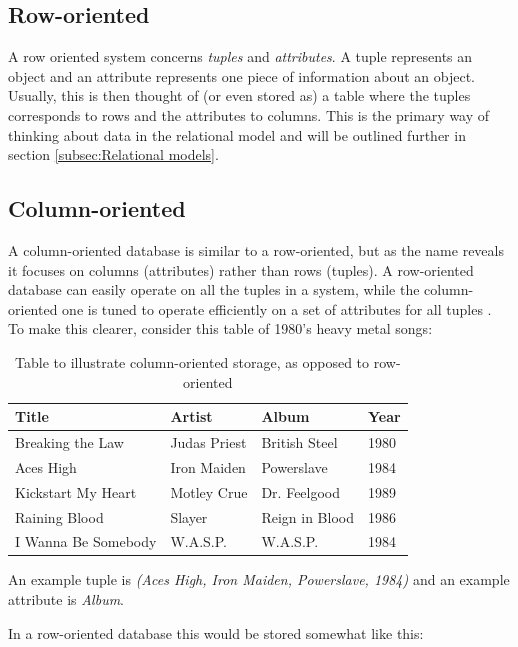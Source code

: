 \subsection{Row-oriented}

A row oriented system concerns \textit{tuples} and \textit{attributes}. A tuple represents an object and an attribute represents one piece of information about an object. Usually, this is then thought of (or even stored as) a table where the tuples corresponds to rows and the attributes to columns.\cite{Codd} This is the primary way of thinking about data in the relational model and will be outlined further in section \ref{subsec:Relational models}.

\subsection{Column-oriented}

A column-oriented database is similar to a row-oriented, but as the name reveals it focuses on columns (attributes) rather than rows (tuples). A row-oriented database can easily operate on all the tuples in a system, while the column-oriented one is tuned to operate efficiently on a set of attributes for all tuples \cite{Copeland}.
\pagebreak
To make this clearer, consider this table of 1980's heavy metal songs:

\begin{table} [ht]
\caption{Table to illustrate column-oriented storage, as opposed to row-oriented}
\centering
\begin{tabular}{l|l|l|l}
\hline\hline
Title		            &	 Artist        &  Album           &  Year \\
\hline
Breaking the Law    &  Judas Priest  &  British Steel   &  1980 \\
Aces High           &  Iron Maiden   &  Powerslave      &  1984 \\
Kickstart My Heart  &  Motley Crue   &  Dr. Feelgood    &  1989 \\
Raining Blood       &  Slayer        &  Reign in Blood  &  1986 \\
I Wanna Be Somebody &  W.A.S.P.      &  W.A.S.P.        &  1984 \\
\hline
\end{tabular}
\end{table}

An example tuple is \textit{(Aces High, Iron Maiden, Powerslave, 1984)} and an example attribute is \textit{Album}.

In a row-oriented database this would be stored somewhat like this:

